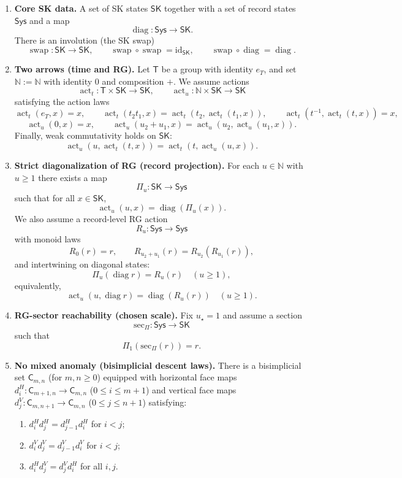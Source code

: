\documentclass[aps,prl,reprint]{revtex4-2}
\newcommand{\Sys}{\mathsf{Sys}}
\newcommand{\SK}{\mathsf{SK}}
\newcommand{\Time}{\mathsf{T}}
\newcommand{\RG}{\mathbb{N}}
\newcommand{\CSK}{\mathsf{C}}
\newcommand{\diag}{\operatorname{diag}}
\newcommand{\swap}{\operatorname{swap}}
\newcommand{\actT}{\operatorname{act}_t}
\newcommand{\actU}{\operatorname{act}_u}
\theoremstyle{definition}
\theoremstyle{plain}
\begin{document}
\begin{enumerate}[label=\textbf{(A\arabic*)},leftmargin=*,itemsep=0.6em]
\item \textbf{Core SK data.}
A set of SK states $\SK$ together with a set of record states $\Sys$ and a map
\[\diag:\Sys\to\SK.\]
There is an involution (the SK swap)
\[\swap:\SK\to\SK,\qquad \swap\circ\swap=\mathrm{id}_{\SK},\qquad \swap\circ\diag=\diag.\]

\item \textbf{Two arrows (time and RG).}
Let $\Time$ be a group with identity $e_T$, and set $\RG:=\mathbb N$ with identity
$0$ and composition $+$.
We assume actions
\[
\actT:\Time\times\SK\to\SK,\qquad \actU:\RG\times\SK\to\SK
\]
satisfying the action laws
\[
\actT(e_T,x)=x,\qquad \actT(t_2t_1,x)=\actT(t_2,\actT(t_1,x)),\qquad
\actT(t^{-1},\actT(t,x))=x,
\]
\[
\actU(0,x)=x,\qquad \actU(u_2+u_1,x)=\actU(u_2,\actU(u_1,x)).
\]
Finally, weak commutativity holds on $\SK$:
\[
\actU(u,\actT(t,x))=\actT(t,\actU(u,x)).
\]

\item \textbf{Strict diagonalization of RG (record projection).}
For each $u\in\mathbb N$ with $u\ge 1$ there exists a map
\[
\Pi_{u}:\SK\to\Sys
\]
such that for all $x\in\SK$,
\[
\actU(u,x)=\diag(\Pi_{u}(x)).
\]
We also assume a record-level RG action
\[
R_u:\Sys\to\Sys
\]
with monoid laws
\[
R_0(r)=r,\qquad R_{u_2+u_1}(r)=R_{u_2}(R_{u_1}(r)),
\]
and intertwining on diagonal states:
\[
\Pi_{u}(\diag r)=R_{u}(r)\quad (u\ge 1),
\]
equivalently,
\[
\actU(u,\diag r)=\diag(R_u(r))\quad (u\ge 1).
\]

\item \textbf{RG-sector reachability (chosen scale).}
Fix $u_\star=1$ and assume a section
\[
\mathrm{sec}_\Pi:\Sys\to\SK
\]
such that
\[
\Pi_{1}(\mathrm{sec}_\Pi(r))=r.
\]

\item \textbf{No mixed anomaly (bisimplicial descent laws).}
There is a bisimplicial set $\CSK_{m,n}$ (for $m,n\ge 0$) equipped with
horizontal face maps $d^H_i:\CSK_{m+1,n}\to\CSK_{m,n}$ ($0\le i\le m+1$)
and vertical face maps $d^V_j:\CSK_{m,n+1}\to\CSK_{m,n}$ ($0\le j\le n+1$)
satisfying:
\begin{enumerate}[label=\textbf{(A5.\alph*)},leftmargin=*,itemsep=0.4em]
\item $d^H_i d^H_j = d^H_{j-1} d^H_i$ for $i<j$;
\item $d^V_i d^V_j = d^V_{j-1} d^V_i$ for $i<j$;
\item $d^H_i d^V_j = d^V_j d^H_i$ for all $i,j$.
\end{enumerate}


\end{enumerate}
\end{document}

